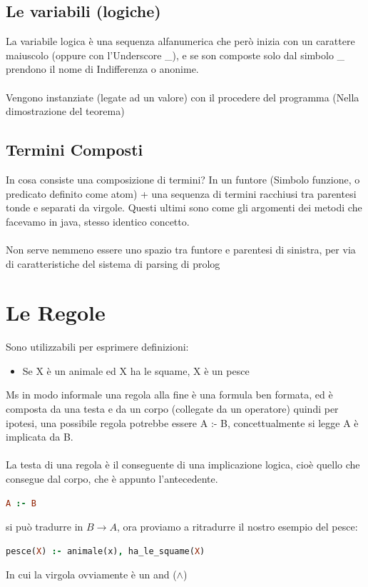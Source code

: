 \documentclass[12pt, a4paper, openany, oneside]{book}
\begin{document}
{\subsection{Le variabili (logiche)}
La variabile logica è una sequenza alfanumerica che però inizia con un carattere
maiuscolo (oppure con l'Underscore \_), e se son composte solo dal simbolo \_ 
prendono il nome di Indifferenza o anonime.
\\ \\
Vengono instanziate (legate ad un valore) con il procedere del programma 
(Nella dimostrazione del teorema)
\subsection{Termini Composti}
In cosa consiste una composizione di termini? In un \color{red} funtore
\color{black} (Simbolo funzione, o predicato definito come atom) +
una sequenza di termini racchiusi tra parentesi tonde e separati da virgole.
Questi ultimi sono come gli argomenti dei metodi che facevamo in java, stesso
identico concetto. \\ \\
Non serve nemmeno essere uno spazio tra funtore e parentesi di sinistra, per 
via di caratteristiche del sistema di parsing di prolog
\section{Le Regole}
Sono utilizzabili per esprimere definizioni:
\begin{itemize}
	\item Se X è un animale ed X ha le squame, X è un pesce
\end{itemize}
Ms in modo informale una regola alla fine è una formula ben formata, ed è composta
da una testa e da un corpo (collegate da un operatore) quindi per ipotesi, una 
possibile regola potrebbe essere A :- B, concettualmente si legge A è 
implicata da B.
\\ \\
La testa di una regola è il conseguente di una implicazione logica, cioè quello 
che consegue dal corpo, che è appunto l'antecedente.
\begin{lstlisting}[language = Prolog]
A :- B
\end{lstlisting} 
si può tradurre in $B \to A$, ora proviamo a ritradurre il nostro
esempio del pesce:
\begin{lstlisting}[language = Prolog]
pesce(X) :- animale(x), ha_le_squame(X)
\end{lstlisting} 
In cui la virgola ovviamente è un and ($\wedge$) \\ \\
}
\end{document}
